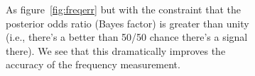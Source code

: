 \documentclass[showpacs, superscriptaddress, showpacs, letterpaper, showkeys,
preprintnumbers, altaffilletter, amssymb, amsmath, amsfonts, prd,
onecolumn, floatfix, nofootinbib]{revtex4-1}
\begin{document}
\begin{figure}
\begin{subfigure}{0.45\textwidth}
{}
\caption{As figure~\ref{fig:freqerr} but with the constraint that the posterior
odds ratio (Bayes factor) is greater than unity (i.e., there's a better than
50/50 chance there's a signal there).  We see that this dramatically improves
the accuracy of the frequency measurement.~\\~\\~\\~\\~\\~\\}
\end{subfigure}
\begin{subfigure}{0.45\textwidth}
{}

\end{subfigure}
\end{figure}
\end{document}
